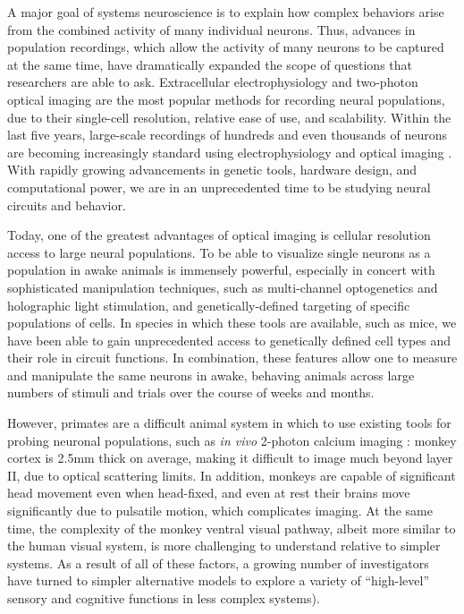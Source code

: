 A major goal of systems neuroscience is to explain how complex behaviors arise from the combined activity of many individual neurons. Thus, advances in population recordings, which allow the activity of many neurons to be captured at the same time, have dramatically expanded the scope of questions that researchers are able to ask. Extracellular electrophysiology and two-photon optical imaging are the most popular methods for recording neural populations, due to their single-cell resolution, relative ease of use, and scalability. Within the last five years, large-scale recordings of hundreds and even thousands of neurons are becoming increasingly standard using electrophysiology \cite{Steinmetz2019, Siegle2021} and optical imaging \cite{Stringer2019a, Weisenburger2019, Sofroniew2016}. With rapidly growing advancements in genetic tools, hardware design, and computational power, we are in an unprecedented time to be studying neural circuits and behavior. 

Today, one of the greatest advantages of optical imaging is cellular resolution access to large neural populations. To be able to visualize single neurons as a population in awake animals is immensely powerful, especially in concert with sophisticated manipulation techniques, such as multi-channel optogenetics and holographic light stimulation\cite{Gill2020}, and genetically-defined targeting of specific populations of cells. In species in which these tools are available, such as mice, we have been able to gain unprecedented access to genetically defined cell types and their role in circuit functions\cite{Luo2008, Luo2018, Huberman2011}. In combination, these features allow one to measure and manipulate the same neurons in awake, behaving animals across large numbers of stimuli and trials over the course of weeks and months. 


However, primates are a difficult animal system in which to use existing tools for probing neuronal populations, such as \textit{in vivo} 2-photon calcium imaging \cite{Ohki2005}: monkey cortex is 2.5mm thick on average\cite{Koo2012}, making it difficult to image much beyond layer II, due to optical scattering limits. In addition, monkeys are capable of significant head movement even when head-fixed, and even at rest their brains move significantly due to pulsatile motion, which complicates imaging. At the same time, the complexity of the monkey ventral visual pathway, albeit more similar to the human visual system, is more challenging to understand relative to simpler systems. As a result of all of these factors, a growing number of investigators have turned to simpler alternative models to explore a variety of ``high-level'' sensory and cognitive functions in less complex systems\cite{Brunton2013, Miller2017TwoStep, Aronov2014, Glickfeld2017}).

